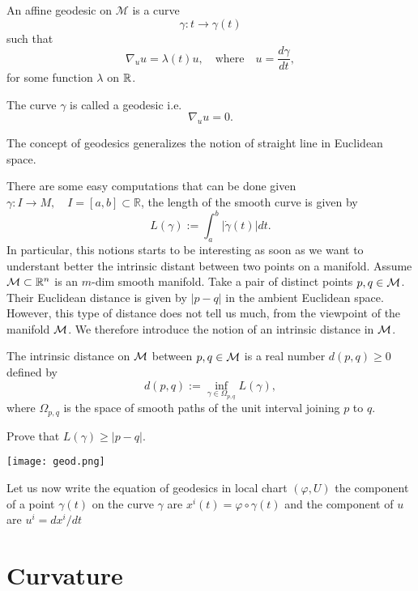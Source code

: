  \begin{definition} 
 An affine geodesic on $\mathcal{M}$ is a curve \[\gamma : t\to \gamma(t)\]  such that
 \begin{equation}
 \nabla_{u}u=\lambda(t)u,\quad \text{where} \quad u=\frac{d\gamma}{dt},
 \end{equation}
 for some function $\lambda$ on $\mathbb{R}$.
 
The curve $\gamma$ is called a geodesic i.e.
 \begin{equation} \nabla_{u}u=0.\end{equation}
 \end{definition}

The concept of geodesics  generalizes the notion of straight line in Euclidean space.

There are some easy computations that can be done given $\gamma:I\to M, \quad I=[a,b]\subset \mathbb{R}$, the length of the smooth curve  is given by
\[L(\gamma):=\int_{a}^b|\dot \gamma(t)|dt.\]
In particular, this notions starts to be interesting as soon as we want to understant better the intrinsic distant between two points on a manifold. 
Assume $\mathcal{M}\subset \mathbb{R}^n$ is an $m$-dim smooth manifold. Take a pair of distinct points $p,q\in \mathcal{M}$. 
Their Euclidean distance is given by $|p-q|$ in the ambient Euclidean space.
However, this type of distance does not tell us much, from the viewpoint of the manifold $\mathcal{M}$.
We therefore introduce the notion of an intrinsic distance in $\mathcal{M}$.
\begin{definition}
The intrinsic distance on $\mathcal{M}$ between $p, q\in \mathcal{M}$ is a real number $d(p,q)\geq 0$ 
defined by \[d(p,q):=\inf_{\gamma\in \Omega_{p,q}}L(\gamma),\] 
where $\Omega_{p,q}$ is the space of smooth paths of the unit interval joining $p$ to $q$. 
\end{definition} 

\begin{ex}
Prove that $L(\gamma)\geq |p-q|$.
\end{ex}
\begin{center}
    \texttt{[image: geod.png]}
    \end{center}
 Let us now write the equation of geodesics in local chart $(\varphi,U)$ the component of a point $\gamma(t)$ on the curve $\gamma$  are $x^{i} (t)=\varphi\circ\gamma(t)$ and the component of $u$ are $u^{i}=dx^{i}/dt$



\section{Curvature}
